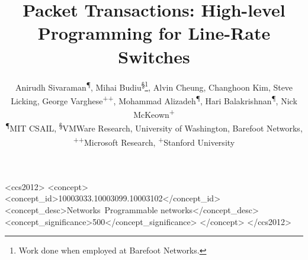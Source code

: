\documentclass[10pt]{sig-alternate-05-2015}
\begin{document}
{}


\date{}

\title{Packet Transactions: High-level Programming for Line-Rate Switches}
\author{
\alignauthor \fontsize{10.7}{9.9}\selectfont Anirudh Sivaraman\textsuperscript{\P}, Mihai Budiu\textsuperscript{\S}\thanks{Work done when employed at Barefoot Networks.}, Alvin Cheung\textsuperscript{\ddag}, Changhoon Kim\textsuperscript{\dag}, Steve Licking\textsuperscript{\dag}, \fontsize{10.7}{9.9}\selectfont George Varghese\textsuperscript{++}, Mohammad Alizadeh\textsuperscript{\P}, Hari Balakrishnan\textsuperscript{\P}, Nick McKeown\textsuperscript{+}\\
\affaddr \fontsize{9.6}{9.9}\selectfont \textsuperscript{\P}MIT CSAIL, \textsuperscript{\S}VMWare Research, \textsuperscript{\ddag}University of Washington, \textsuperscript{\dag}Barefoot Networks, \textsuperscript{++}Microsoft Research, \textsuperscript{+}Stanford University
}

\maketitle



\begin{CCSXML}
<ccs2012>
<concept>
<concept_id>10003033.10003099.10003102</concept_id>
<concept_desc>Networks~Programmable networks</concept_desc>
<concept_significance>500</concept_significance>
</concept>
</ccs2012>
\end{CCSXML}


\printccsdesc












\balance
{\small 
}

%
\end{document}
